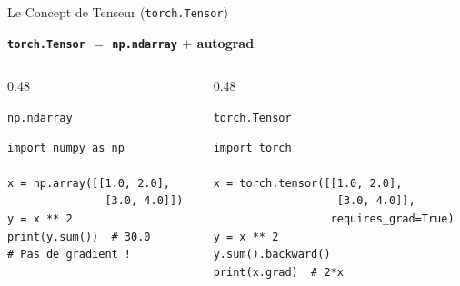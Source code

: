 \documentclass[aspectratio=169, 10pt]{beamer}
\begin{document}
\begin{frame}[fragile]{Le Concept de Tenseur (\texttt{torch.Tensor})}
  \begin{center}
    \Large\bfseries\color{jedy_blue}
    \texttt{torch.Tensor} $=$ \texttt{np.ndarray} $+$ autograd
  \end{center}
  \medskip
  \begin{columns}[T]
    \begin{column}{0.48\textwidth}
      \begin{block}{\texttt{np.ndarray}}
        \begin{lstlisting}[style=pythonstyle]
import numpy as np

x = np.array([[1.0, 2.0],
               [3.0, 4.0]])
y = x ** 2
print(y.sum())  # 30.0
# Pas de gradient !
        \end{lstlisting}
      \end{block}
    \end{column}
    \begin{column}{0.48\textwidth}
      \begin{exampleblock}{\texttt{torch.Tensor}}
        \begin{lstlisting}[style=pythonstyle]
import torch

x = torch.tensor([[1.0, 2.0],
                   [3.0, 4.0]],
                  requires_grad=True)
y = x ** 2
y.sum().backward()
print(x.grad)  # 2*x
        \end{lstlisting}
      \end{exampleblock}
    \end{column}
  \end{columns}
\end{frame}
\end{document}
